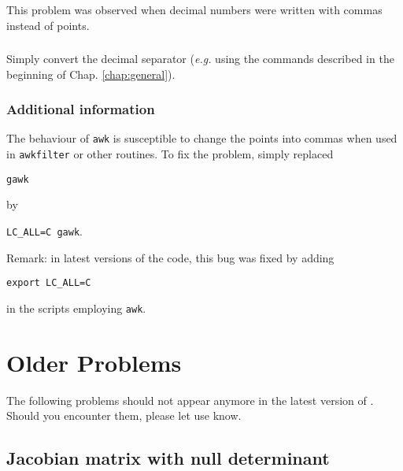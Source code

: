 \subsubsection{\question}


This problem was observed when decimal numbers were written with commas instead of points.


\subsubsection{\answer}

Simply convert the decimal separator (\textit{e.g.} using the commands described in the beginning of Chap. \ref{chap:general}).


\subsubsection{Additional information}

The behaviour of \texttt{awk} is susceptible to change the points into commas when used in \texttt{awkfilter} or other routines. To fix the problem, simply replaced

\texttt{gawk}

by

\texttt{LC\_ALL=C gawk}.

Remark: in latest versions of the code, this bug was fixed by adding 

\texttt{export LC\_ALL=C}

in the scripts employing \texttt{awk}.


\section{Older Problems}

The following problems should not appear anymore in the latest version of \diva. Should you encounter them, please let use know.


\subsection{Jacobian matrix with null determinant}

